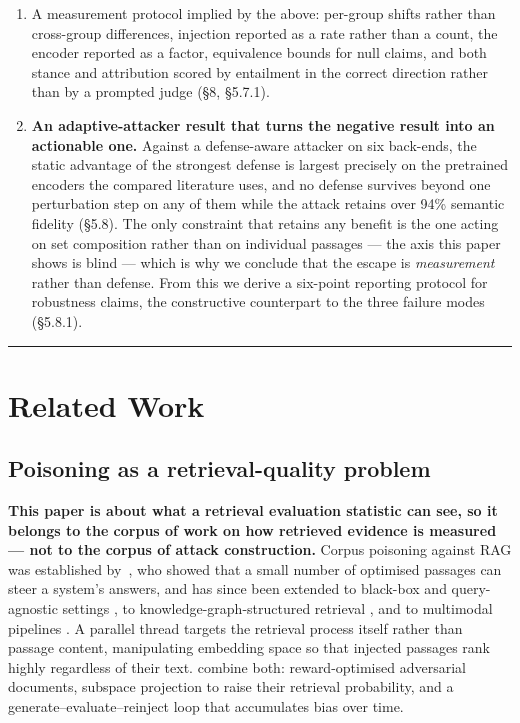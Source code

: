\documentclass[authoryear,review,3p,times]{elsarticle}
\begin{document}
\begin{enumerate}
  A scale check that bounds the sparsity account of encoder susceptibility: susceptibility is \textbf{not monotone in encoder size} (GTE 0.0625 \(\rightarrow\) 0.5000 while E5 0.0625 \(\rightarrow\) 0.0000 within matched families), so it is a per-checkpoint property (§5.6).
\item
  A measurement protocol implied by the above: per-group shifts rather than cross-group differences, injection reported as a rate rather than a count, the encoder reported as a factor, equivalence bounds for null claims, and both stance and attribution scored by entailment in the correct direction rather than by a prompted judge (§8, §5.7.1).
\item
  \textbf{An adaptive-attacker result that turns the negative result into an actionable one.} Against a defense-aware attacker on six back-ends, the static advantage of the strongest defense is largest precisely on the pretrained encoders the compared literature uses, and no defense survives beyond one perturbation step on any of them while the attack retains over 94\% semantic fidelity (§5.8). The only constraint that retains any benefit is the one acting on set composition rather than on individual passages --- the axis this paper shows is blind --- which is why we conclude that the escape is \emph{measurement} rather than defense. From this we derive a six-point reporting protocol for robustness claims, the constructive counterpart to the three failure modes (§5.8.1).
\end{enumerate}

\begin{center}\rule{0.5\linewidth}{0.5pt}\end{center}

\section{Related Work}\label{related-work}

\subsection{Poisoning as a retrieval-quality problem}\label{poisoning-as-a-retrieval-quality-problem}

\textbf{This paper is about what a retrieval evaluation statistic can see, so it belongs to the corpus of work on how retrieved evidence is measured --- not to the corpus of attack construction.} Corpus poisoning against RAG was established by~\citet{zou2025}, who showed that a small number of optimised passages can steer a system's answers, and has since been extended to black-box and query-agnostic settings \citep{zhang2025}, to knowledge-graph-structured retrieval \citep{liang2026}, and to multimodal pipelines \citep{ha2025,liu2025,edemacu2026}. A parallel thread targets the retrieval process itself rather than passage content, manipulating embedding space so that injected passages rank highly regardless of their text. \citet{wang2025} combine both: reward-optimised adversarial documents, subspace projection to raise their retrieval probability, and a generate--evaluate--reinject loop that accumulates bias over time.
\end{document}
